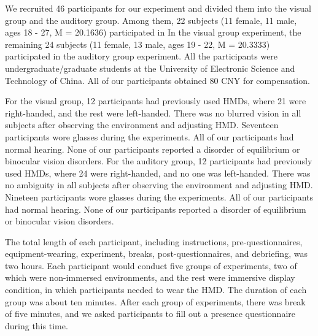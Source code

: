 \documentclass[sigconf]{acmart}
\begin{document}
We recruited 46 participants for our experiment and divided them into the visual group and the auditory group. Among them, 22 subjects (11 female, 11 male, ages 18 - 27, M = 20.1636) participated in In the visual group experiment, the remaining 24 subjects (11 female, 13 male, ages 19 - 22, M = 20.3333) participated in the auditory group experiment. All the participants were undergraduate/graduate students at the University of Electronic Science and Technology of China. All of our participants obtained 80 CNY for compensation.


For the visual group, 12 participants had previously used HMDs, where 21 were right-handed, and the rest were left-handed. There was no blurred vision in all subjects after observing the environment and adjusting HMD. Seventeen participants wore glasses during the experiments. All of our participants had normal hearing. None of our participants reported a disorder of equilibrium or binocular vision disorders. For the auditory group, 12 participants had previously used HMDs, where 24 were right-handed, and no one was left-handed. There was no ambiguity in all subjects after observing the environment and adjusting HMD. Nineteen participants wore glasses during the experiments. All of our participants had normal hearing. None of our participants reported a disorder of equilibrium or binocular vision disorders.


The total length of each participant, including instructions, pre-questionnaires, equipment-wearing, experiment, breaks, post-questionnaires, and debriefing, was two hours. Each participant would conduct five groups of experiments, two of which were non-immersed environments, and the rest were immersive display condition, in which participants needed to wear the HMD. The duration of each group was about ten minutes. After each group of experiments, there was break of five minutes, and we asked participants to fill out a presence questionnaire during this time.
\end{document}
